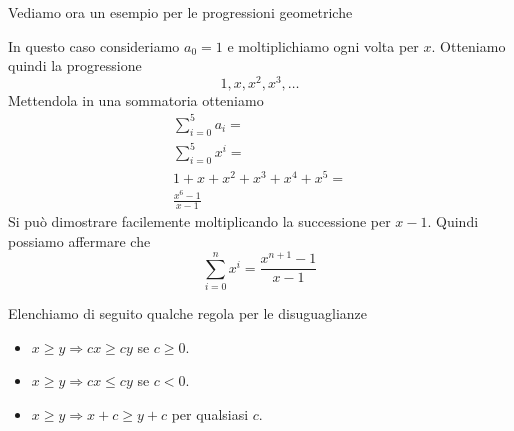 Vediamo ora un esempio per le progressioni geometriche
\begin{example}
	In questo caso consideriamo $a_0 = 1$ e moltiplichiamo ogni volta per $x$. Otteniamo quindi
	la progressione
	\begin{equation*}
		1, x, x^2, x^3, \dots
	\end{equation*}
	Mettendola in una sommatoria otteniamo
	\begin{gather*}
		\sum_{i = 0}^5 a_i = \\
		\sum_{i = 0}^5 x^i = \\
		1 + x + x^2 + x^3 + x^4 + x^5 = \\
		\frac{x^6 - 1}{x - 1}
	\end{gather*}
	Si pu\`o dimostrare facilemente moltiplicando la successione per $x - 1$.
	Quindi possiamo affermare che
	\begin{equation*}
		\sum_{i = 0}^n x^i = \frac{x^{n + 1} - 1}{x - 1}
	\end{equation*}
\end{example}

Elenchiamo di seguito qualche regola per le disuguaglianze
\begin{itemize}
	\item $x \geq y \Rightarrow cx \geq cy$ se $c \geq 0$.
	\item $x \geq y \Rightarrow cx \leq cy$ se $c < 0$.
	\item $x \geq y \Rightarrow x + c \geq y + c$ per qualsiasi $c$.
\end{itemize}
